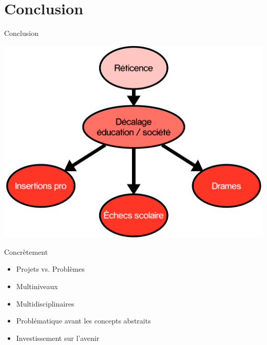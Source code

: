 \section{Conclusion}

\begin{frame}{Conclusion}
   \begin{center}
     \includegraphics[width=.7\textwidth]{../resources/illustrations/ccl}
   \end{center}
\end{frame}

\begin{frame}{Concrètement}
\begin{itemize}
  \item Projets vs. Problèmes
  \item Multiniveaux
  \item Multidisciplinaires
  \item Problématique avant les concepts abstraits
  \item Investissement sur l'avenir
\end{itemize}
\end{frame}

